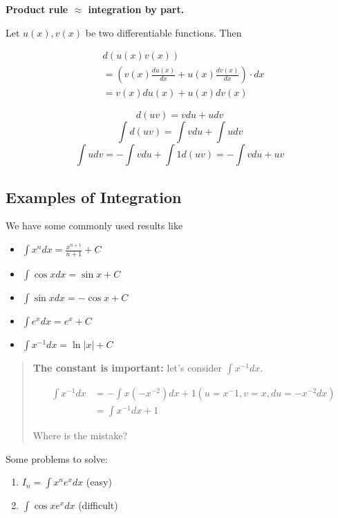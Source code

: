 \textbf{Product rule $\approx$ integration by part.}

Let $u(x), v(x)$ be two differentiable functions. Then

\begin{equation*}
\begin{split}
&d(u(x)v(x))\\
&= (v(x)\frac{du(x)}{dx} + u(x)\frac{dv(x)}{dx}) \cdot dx\\ 
&= v(x)du(x) + u(x)dv(x)
\end{split}
\end{equation*}

$$ d(uv) = vdu + udv $$
$$ \int d(uv) = \int vdu + \int udv $$
$$ \int udv = - \int vdu + \int 1 d(uv) = - \int vdu + uv $$

\subsection{Examples of Integration}

We have some commonly used results like

\begin{itemize}
    \item $\int x^n dx = \frac{x^{n+1}}{n+1} + C$
    \item $\int \cos x dx = \sin x + C$
    \item $\int \sin x dx = -\cos x + C$
    \item $\int e^x dx = e^x + C$
    \item $\int x^{-1} dx = \ln |x| + C$
\end{itemize}

\begin{quote}
    \textbf{The constant is important:} let's consider $\int x^{-1} dx$.
    
    \begin{equation*}
    \begin{split}
        \int x^{-1} dx
        &= -\int x (-x^{-2}) dx + 1 (u = x^-1, v = x, du = -x^{-2} dx)\\
        &= \int x^{-1} dx + 1
    \end{split}
    \end{equation*}
    
    Where is the mistake?
\end{quote}

Some problems to solve:

\begin{enumerate}
    \item $I_n = \int x^n e^x dx$ (easy)
    \item $\int \cos x e^x dx$ (difficult)
\end{enumerate}

